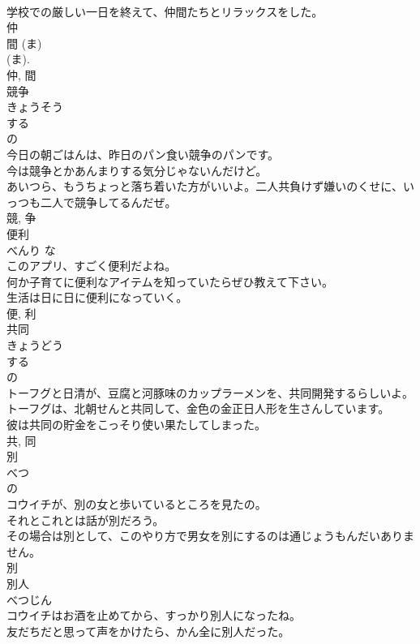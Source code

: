 \documentclass[8pt]{extreport}
\begin{document}
\begin{CJK}{UTF8}{min}
\\	学校での厳しい一日を終えて、仲間たちとリラックスをした。	
\\	仲 
\\	間 (ま) 
\\	(ま). 
\\	仲, 間	
\\	競争	
\\	きょうそう	
\\	する 
\\	の 
\\	今日の朝ごはんは、昨日のパン食い競争のパンです。	
\\	今は競争とかあんまりする気分じゃないんだけど。	
\\	あいつら、もうちょっと落ち着いた方がいいよ。二人共負けず嫌いのくせに、いっつも二人で競争してるんだぜ。	
\\	競, 争	
\\	便利	
\\	べんり	な 
\\	このアプリ、すごく便利だよね。	
\\	何か子育てに便利なアイテムを知っていたらぜひ教えて下さい。	
\\	生活は日に日に便利になっていく。	
\\	便, 利	
\\	共同	
\\	きょうどう	
\\	する 
\\	の 
\\	トーフグと日清が、豆腐と河豚味のカップラーメンを、共同開発するらしいよ。	
\\	トーフグは、北朝せんと共同して、金色の金正日人形を生さんしています。	
\\	彼は共同の貯金をこっそり使い果たしてしまった。	
\\	共, 同	
\\	別	
\\	べつ	
\\	の 
\\	コウイチが、別の女と歩いているところを見たの。	
\\	それとこれとは話が別だろう。	
\\	その場合は別として、このやり方で男女を別にするのは通じょうもんだいありません。	
\\	別	
\\	別人	
\\	べつじん	
\\	コウイチはお酒を止めてから、すっかり別人になったね。	
\\	友だちだと思って声をかけたら、かん全に別人だった。	

\end{CJK}
\end{document}
